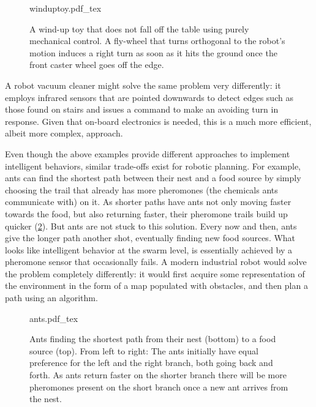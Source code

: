 \begin{figure}
    \centering
    \def\svgwidth{\textwidth}
    {winduptoy.pdf_tex}
    \caption{A wind-up toy that does not fall off the table using purely mechanical control. A fly-wheel that turns orthogonal to the robot's motion induces a right turn as soon as it hits the ground once the front caster wheel goes off the edge.}
    \label{fig:winduptoy}
\end{figure}

A robot vacuum cleaner might solve the same problem very differently: it employs infrared sensors that are pointed downwards to detect edges such as those found on stairs and issues a command to make an avoiding turn in response. Given that on-board electronics is needed, this is a much more efficient, albeit more complex, approach.

Even though the above examples provide different approaches to implement intelligent behaviors, similar trade-offs exist for robotic planning. For example, ants can find the shortest path between their nest and a food source by simply choosing the trail that already has more pheromones (the chemicals ants communicate with) on it. As shorter paths have ants not only moving faster towards the food, but also returning faster, their pheromone trails build up quicker (\cref{fig:ants}). But ants are not stuck to this solution. Every now and then, ants give the longer path another shot, eventually finding new food sources. What looks like intelligent behavior at the swarm level, is essentially achieved by a pheromone sensor that occasionally fails. A modern industrial robot would solve the problem completely differently: it would first acquire some representation of the environment in the form of a map populated with obstacles, and then plan a path using an algorithm.

\begin{figure}
    \centering
    \def\svgwidth{\textwidth}
    {ants.pdf_tex}
    \caption{Ants finding the shortest path from their nest (bottom) to a food source (top). From left to right: The ants initially have equal preference for the left and the right branch, both going back and forth. As ants return faster on the shorter branch there will be more pheromones present on the short branch once a new ant arrives from the nest.}
    \label{fig:ants}
\end{figure}

